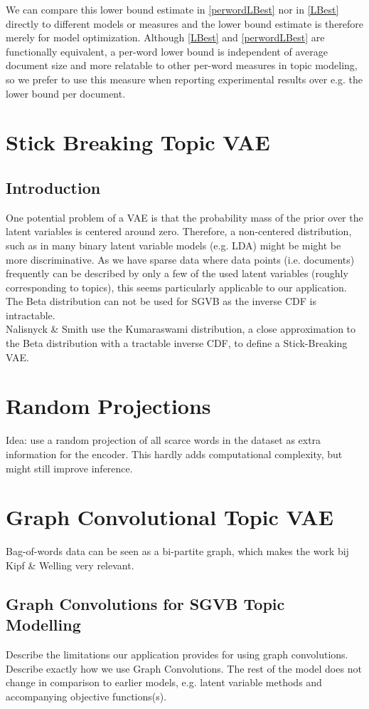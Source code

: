 \documentclass{report}
\begin{document}
We can compare this lower bound estimate in \ref{perwordLBest} nor in \ref{LBest} directly to different models or measures and the lower bound estimate is therefore merely for model optimization. Although \ref{LBest} and \ref{perwordLBest} are functionally equivalent, a per-word lower bound is independent of average document size and more relatable to other per-word measures in topic modeling, so we prefer to use this measure when reporting experimental results over e.g. the lower bound per document.



\section{Stick Breaking Topic VAE}
\subsection{Introduction}
One potential problem of a VAE is that the probability mass of the prior over the latent variables is centered around zero. Therefore, a non-centered distribution, such as in many binary latent variable models (e.g. LDA) might be might be more discriminative. As we have sparse data where data points (i.e. documents) frequently can be described by only a few of the used latent variables (roughly corresponding to topics), this seems particularly applicable to our application.  \\
The Beta distribution can not be used for SGVB as the inverse CDF is intractable. \\
Nalisnyck \& Smith use the Kumaraswami distribution, a close approximation to the Beta distribution with a tractable inverse CDF, to define a Stick-Breaking VAE. \\

\section{Random Projections}
Idea: use a random projection of all scarce words in the dataset as extra information for the encoder. This hardly adds computational complexity, but might still improve inference.

\section{Graph Convolutional Topic VAE}
Bag-of-words data can be seen as a bi-partite graph, which makes the work bij Kipf \& Welling very relevant.
\subsection{Graph Convolutions for SGVB Topic Modelling}
Describe the limitations our application provides for using graph convolutions.\\
Describe exactly how we use Graph Convolutions. The rest of the model does not change in comparison to earlier models, e.g. latent variable methods and accompanying objective functions(s).
\end{document}

